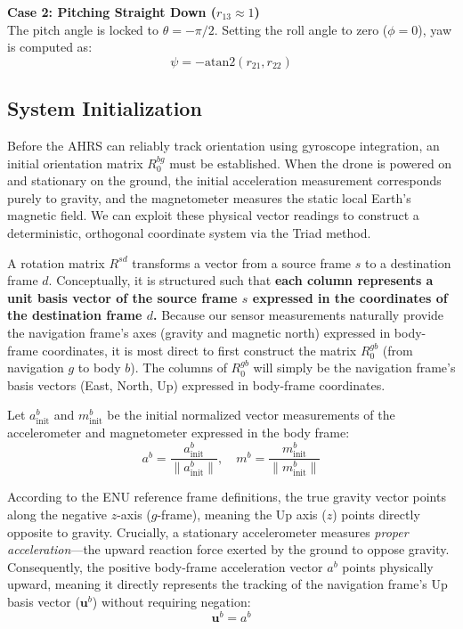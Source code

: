 \documentclass{article}
\begin{document}
\vspace{1em}
\noindent \textbf{Case 2: Pitching Straight Down ($r_{13} \approx 1$)} \\
The pitch angle is locked to $\theta = -\pi/2$. Setting the roll angle to zero ($\phi = 0$), yaw is computed as:
\[
\psi = -\text{atan2}\left(r_{21}, r_{22}\right)
\]

\subsection{System Initialization}

Before the AHRS can reliably track orientation using gyroscope integration, an initial orientation matrix $R_0^{bg}$ must be established. When the drone is powered on and stationary on the ground, the initial acceleration measurement corresponds purely to gravity, and the magnetometer measures the static local Earth's magnetic field. We can exploit these physical vector readings to construct a deterministic, orthogonal coordinate system via the Triad method.

A rotation matrix $R^{sd}$ transforms a vector from a source frame $s$ to a destination frame $d$. Conceptually, it is structured such that \textbf{each column represents a unit basis vector of the source frame $s$ expressed in the coordinates of the destination frame $d$.} Because our sensor measurements naturally provide the navigation frame's axes (gravity and magnetic north) expressed in body-frame coordinates, it is most direct to first construct the matrix $R_0^{gb}$ (from navigation $g$ to body $b$). The columns of $R_0^{gb}$ will simply be the navigation frame's basis vectors (East, North, Up) expressed in body-frame coordinates.

\vspace{1em}
\noindent Let $a_{\text{init}}^b$ and $m_{\text{init}}^b$ be the initial normalized vector measurements of the accelerometer and magnetometer expressed in the body frame:
\[
a^b = \frac{a_{\text{init}}^b}{\|a_{\text{init}}^b\|}, \quad m^b = \frac{m_{\text{init}}^b}{\|m_{\text{init}}^b\|}
\]

\noindent According to the ENU reference frame definitions, the true gravity vector points along the negative $z$-axis ($g$-frame), meaning the Up axis ($z$) points directly opposite to gravity. Crucially, a stationary accelerometer measures \textit{proper acceleration}—the upward reaction force exerted by the ground to oppose gravity. Consequently, the positive body-frame acceleration vector $a^b$ points physically upward, meaning it directly represents the tracking of the navigation frame's Up basis vector ($\mathbf{u}^b$) without requiring negation:
\[
\mathbf{u}^b = a^b
\]
\end{document}
